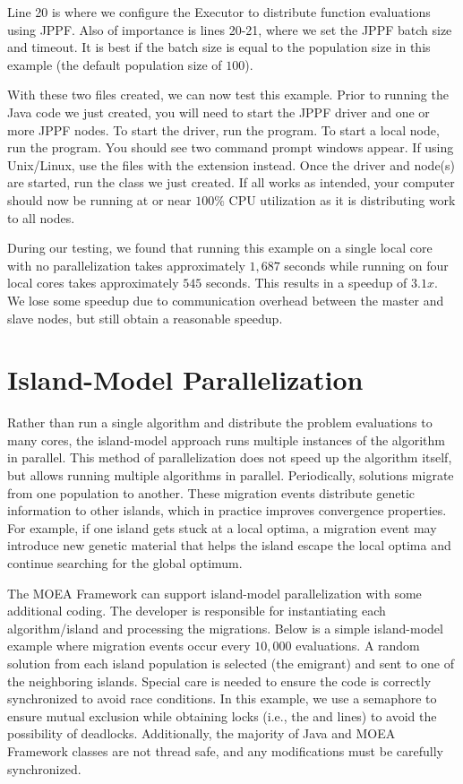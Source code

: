 {Line 20 is where we configure the Executor to distribute function evaluations using JPPF.  Also of importance is lines 20-21, where we set the JPPF batch size and timeout.  It is best if the batch size is equal to the population size in this example (the default population size of $100$).

With these two files created, we can now test this example.  Prior to running the Java code we just created, you will need to start the JPPF driver and one or more JPPF nodes.  To start the driver, run the  program.  To start a local node, run the  program.  You should see two command prompt windows appear.  If using Unix/Linux, use the files with the  extension instead.  Once the driver and node(s) are started, run the  class we just created.  If all works as intended, your computer should now be running at or near $100\%$ CPU utilization as it is distributing work to all nodes.

During our testing, we found that running this example on a single local core with no parallelization takes approximately $1,687$ seconds while running on four local cores takes approximately $545$ seconds.  This results in a speedup of $3.1x$.  We lose some speedup due to communication overhead between the master and slave nodes, but still obtain a reasonable speedup.

\section{Island-Model Parallelization}

Rather than run a single algorithm and distribute the problem evaluations to many cores, the island-model approach runs multiple instances of the algorithm in parallel.  This method of parallelization does not speed up the algorithm itself, but allows running multiple algorithms in parallel.  Periodically, solutions migrate from one population to another.  These migration events distribute genetic information to other islands, which in practice improves convergence properties.  For example, if one island gets stuck at a local optima, a migration event may introduce new genetic material that helps the island escape the local optima and continue searching for the global optimum.

The MOEA Framework can support island-model parallelization with some additional coding.  The developer is responsible for instantiating each algorithm/island and processing the migrations.  Below is a simple island-model example where migration events occur every $10,000$ evaluations.  A random solution from each island population is selected (the emigrant) and sent to one of the neighboring islands.  Special care is needed to ensure the code is correctly synchronized to avoid race conditions.  In this example, we use a semaphore to ensure mutual exclusion while obtaining locks (i.e., the  and  lines) to avoid the possibility of deadlocks.  Additionally, the majority of Java and MOEA Framework classes are not thread safe, and any modifications must be carefully synchronized.

}
